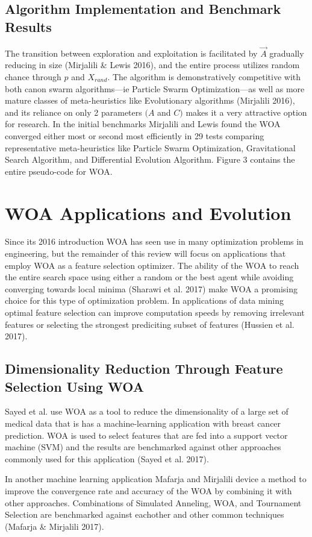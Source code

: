 \documentclass[11pt]{article}
\begin{document}
\subsection*{Algorithm Implementation and Benchmark Results} {
    The transition between exploration and exploitation is facilitated by $\vec{A}$ gradually reducing in size (Mirjalili \& Lewis 2016), and the entire process utilizes random chance through $p$ and $X_{rand}$.
    The algorithm is demonstratively competitive with both canon swarm algorithms---ie Particle Swarm Optimization---as well as more mature classes of meta-heuristics like Evolutionary algorithms (Mirjalili 2016), and its reliance on only 2 parameters $(A$ and $C)$ makes it a very attractive option for research.
    In the initial benchmarks Mirjalili and Lewis found the WOA converged either most or second most efficiently in 29 tests comparing representative meta-heuristics like Particle Swarm Optimization, Gravitational Search Algorithm, and Differential Evolution Algorithm.
    Figure 3 contains the entire pseudo-code for WOA.
}

\section*{WOA Applications and Evolution} {
    Since its 2016 introduction WOA has seen use in many optimization problems in engineering, but the remainder of this review will focus on applications that employ WOA as a feature selection optimizer.
    The ability of the WOA to reach the entire search space using either a random or the best agent while avoiding converging towards local minima (Sharawi et al. 2017) make WOA a promising choice for this type of optimization problem.
    In applications of data mining optimal feature selection can improve computation speeds by removing irrelevant features or selecting the strongest prediciting subset of features (Hussien et al. 2017).
}

\subsection*{Dimensionality Reduction Through Feature Selection Using WOA} {
    Sayed et al. use WOA as a tool to reduce the dimensionality of a large set of medical data that is has a machine-learning application with breast cancer prediction.
    WOA is used to select features that are fed into a support vector machine (SVM) and the results are benchmarked against other approaches commonly used for this application (Sayed et al. 2017).

    In another machine learning application Mafarja and Mirjalili device a method to improve the convergence rate and accuracy of the WOA by combining it with other approaches.
    Combinations of Simulated Anneling, WOA, and Tournament Selection are benchmarked against eachother and other common techniques (Mafarja \& Mirjalili 2017).
}
\end{document}
